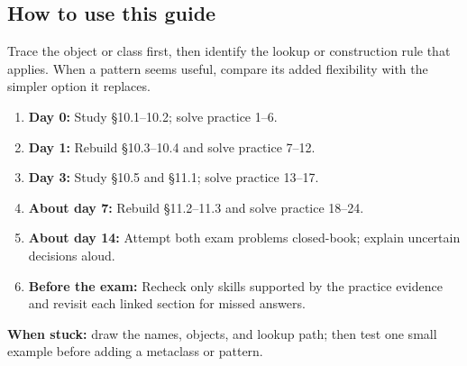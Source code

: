 \documentclass[11pt]{article}
\begin{document}
\begin{keepsection}
\section{How to use this guide}

Trace the object or class first, then identify the lookup or construction rule that applies. When a pattern seems useful, compare its added flexibility with the simpler option it replaces.

\begin{enumerate}
\item \textbf{Day 0:} Study §10.1–10.2; solve practice 1–6.
\item \textbf{Day 1:} Rebuild §10.3–10.4 and solve practice 7–12.
\item \textbf{Day 3:} Study §10.5 and §11.1; solve practice 13–17.
\item \textbf{About day 7:} Rebuild §11.2–11.3 and solve practice 18–24.
\item \textbf{About day 14:} Attempt both exam problems closed-book; explain uncertain decisions aloud.
\item \textbf{Before the exam:} Recheck only skills supported by the practice evidence and revisit each linked section for missed answers.
\end{enumerate}

\begin{notebox}\textbf{When stuck:} draw the names, objects, and lookup path; then test one small example before adding a metaclass or pattern.\end{notebox}
\end{keepsection}
\end{document}
